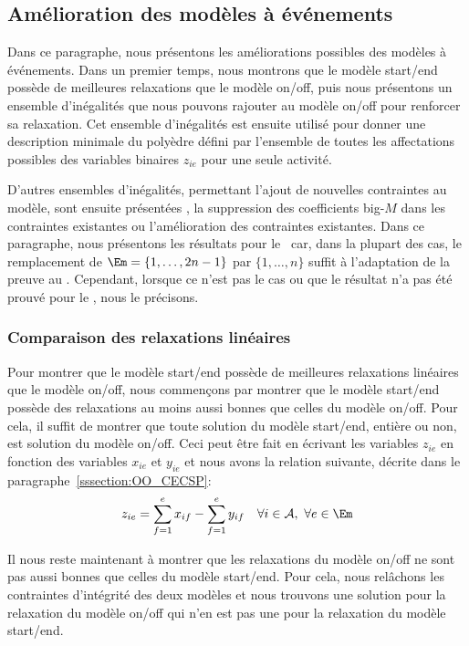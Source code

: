 \subsection{Amélioration des modèles à événements}

Dans ce paragraphe, nous présentons les améliorations possibles des
modèles à événements. Dans un premier temps, nous montrons que le
modèle start/end possède de meilleures relaxations que le modèle
on/off, puis nous présentons un ensemble d'inégalités que nous pouvons
rajouter au modèle on/off pour renforcer sa relaxation. Cet ensemble
d'inégalités est ensuite utilisé pour donner une description minimale
du polyèdre défini par l'ensemble de toutes les affectations possibles
des variables binaires $z_{ie}$ pour une seule activité. 

D'autres ensembles d'inégalités, permettant l'ajout de nouvelles
contraintes au modèle, sont ensuite présentées , la suppression des
coefficients big-$M$ dans les contraintes existantes ou l'amélioration
des contraintes existantes. Dans ce paragraphe, nous présentons les
résultats pour le \CECSP~car, dans la plupart des cas, le remplacement
de $\Em=\{1,\dots,2n-1\}$ par $\{1,\dots,n\}$ suffit à l'adaptation de
la preuve au \RCPSP. Cependant, lorsque ce n'est pas le cas ou que le
résultat n'a pas été prouvé pour le \RCPSP, nous le précisons.

\subsubsection{Comparaison des relaxations linéaires}

Pour montrer que le modèle start/end possède de meilleures relaxations
linéaires que le modèle on/off, nous commençons par montrer que le
modèle start/end possède des relaxations au moins aussi bonnes que
celles du modèle on/off. Pour cela, il suffit de  montrer que toute solution du 
modèle start/end, entière ou non, est solution du modèle on/off. Ceci
peut être fait en écrivant les variables $z_{ie}$ en fonction des
variables $x_{ie}$ et $y_{ie}$ et nous avons la relation suivante,
décrite dans le paragraphe~\ref{sssection:OO_CECSP}: 
\begin{equation}
\label{SEversOO}
z_{ie} = \sum_{f=1}^e x_{if} -  \sum_{f=1}^e y_{if} \quad \forall i
\in \A,\ \forall e\in \Em
\end{equation}

Il nous reste maintenant à montrer que les relaxations du modèle
on/off ne sont pas aussi bonnes que celles du modèle start/end. Pour
cela, nous relâchons les contraintes d'intégrité des deux modèles et
nous trouvons une solution pour la relaxation du modèle on/off qui
n'en est pas une pour la relaxation du modèle start/end. 

